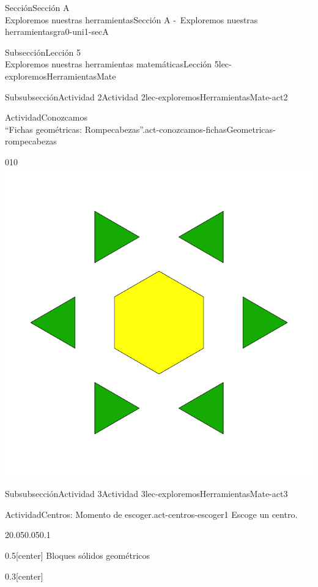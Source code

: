 \begin{sectionptx}{Sección}{{\Large Sección A\\}Exploremos nuestras herramientas}{}{Sección A -~Exploremos nuestras herramientas}{}{}{gra0-uni1-secA}
\begin{subsectionptx}{Subsección}{{\normalsize Lección 5\\[-0.05cm]}Exploremos nuestras herramientas matemáticas}{}{Lección 5}{}{}{lec-exploremosHerramientasMate}
\begin{subsubsectionptx}{Subsubsección}{Actividad 2}{}{Actividad 2}{}{}{lec-exploremosHerramientasMate-act2}
\begin{activity}{Actividad}{Conozcamos\\“Fichas geométricas: Rompecabezas”.}{act-conozcamos-fichasGeometricas-rompecabezas}
\begin{image}{0}{1}{0}{}
\includegraphics[width=0.8\linewidth, center]{external/svg-source/tikz-file-148147.pdf}
\end{image}%
\end{activity}%
\end{subsubsectionptx}
%
%
\typeout{************************************************}
\typeout{************************************************}
%
\clearpage
\begin{subsubsectionptx}{Subsubsección}{Actividad 3}{}{Actividad 3}{}{}{lec-exploremosHerramientasMate-act3}
\begin{activity}{Actividad}{Centros: Momento de escoger.}{act-centros-escoger1}%
Escoge un centro.%
\begin{sidebyside}{2}{0.05}{0.05}{0.1}%
\begin{sbspanel}{0.5}[center]%
Bloques sólidos geométricos%
\end{sbspanel}%
\begin{sbspanel}{0.3}[center]%

\end{sbspanel}
\end{sidebyside}
\end{activity}
\end{subsubsectionptx}
\end{subsectionptx}
\end{sectionptx}
